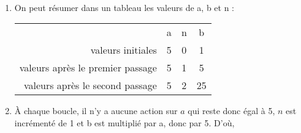 \ \\ [-5mm]
\begin{enumerate}
   \item On peut résumer dans un tableau les valeurs de a, b et n : \\  [1mm]
   \qquad
   {\renewcommand{\arraystretch}{1.2}
   \begin{tabular}{r|c|c|c|}
      \cline{2-4}
      & a & n & b \\
      \cline{2-4}
      valeurs initiales & 5 & 0 & 1 \\
      \cline{2-4}
      valeurs après le premier passage & 5 & 1 & 5 \\
      \cline{2-4}
      valeurs après le second passage & 5 & 2 & 25 \\
      \cline{2-4}
   \end{tabular}}
   \item À chaque boucle, il n'y a aucune action sur $a$ qui reste donc égal à 5, $n$ est incrémenté de 1 et b est multiplié par a, donc par 5. D'où, 
   \end{enumerate}
